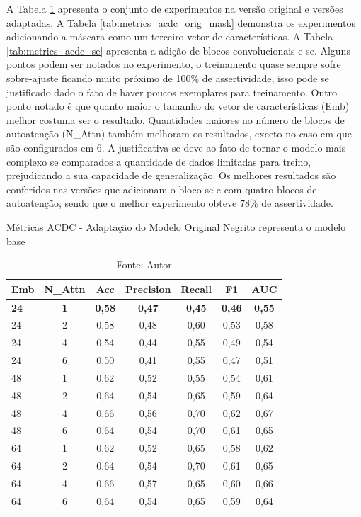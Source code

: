 A Tabela \ref{tab:metrics_acdc_orig} apresenta o conjunto de experimentos na versão original e versões adaptadas. A Tabela \ref{tab:metrics_acdc_orig_mask} demonstra os experimentos adicionando a máscara como um terceiro vetor de características. A Tabela \ref{tab:metrics_acdc_se} apresenta a adição de blocos convolucionais e  \gls{se}. Alguns pontos podem ser notados no experimento, o treinamento quase sempre sofre sobre-ajuste ficando muito próximo de 100\% de assertividade, isso pode se justificado dado o fato de haver poucos exemplares para treinamento. Outro ponto notado é que quanto maior o tamanho do vetor de características (Emb) melhor costuma ser o resultado. Quantidades maiores no número de blocos de autoatenção (N\_Attn) também melhoram os resultados, exceto no caso em que são configurados em $6$. A justificativa se deve ao fato de tornar o modelo mais complexo se comparados a quantidade de dados limitadas para treino, prejudicando a sua capacidade de generalização. Os melhores resultados são conferidos nas versões que adicionam o bloco \gls{se} e com quatro blocos de autoatenção, sendo que o melhor experimento obteve $78\%$ de assertividade.


\begin{table}[htbp]
\centering
\caption{Métricas ACDC - Adaptação do Modelo Original
\newline Negrito representa o modelo base}
\begin{tabular}{lcccccc}
\toprule
\textbf{Emb} & \textbf{N\_Attn} & \textbf{Acc} & \textbf{Precision} & \textbf{Recall} & \textbf{F1} & \textbf{AUC} \\
\midrule
\textbf{24} & \textbf{1} & \textbf{0,58} & \textbf{0,47} & \textbf{0,45} & \textbf{0,46} & \textbf{0,55} \\
24 & 2 & 0,58 & 0,48 & 0,60 & 0,53 & 0,58 \\
24 & 4 & 0,54 & 0,44 & 0,55 & 0,49 & 0,54 \\
24 & 6 & 0,50 & 0,41 & 0,55 & 0,47 & 0,51 \\
\hline
48 & 1 & 0,62 & 0,52 & 0,55 & 0,54 & 0,61 \\
48 & 2 & 0,64 & 0,54 & 0,65 & 0,59 & 0,64 \\
48 & 4 & 0,66 & 0,56 & 0,70 & 0,62 & 0,67 \\
48 & 6 & 0,64 & 0,54 & 0,70 & 0,61 & 0,65 \\
\hline
64 & 1 & 0,62 & 0,52 & 0,65 & 0,58 & 0,62 \\
64 & 2 & 0,64 & 0,54 & 0,70 & 0,61 & 0,65 \\
64 & 4 & 0,66 & 0,57 & 0,65 & 0,60 & 0,66 \\
64 & 6 & 0,64 & 0,54 & 0,65 & 0,59 & 0,64 \\
\bottomrule
\end{tabular}
\caption*{Fonte: Autor}
\label{tab:metrics_acdc_orig}
\end{table}


